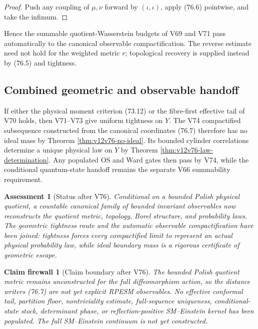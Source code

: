 \documentclass[11pt]{article}
\newtheorem{firewall}[theorem]{Claim firewall}
\newtheorem{assessment}[theorem]{Assessment}
\theoremstyle{remark}
\begin{document}
\begin{proof}
Push any coupling of \(\mu,\nu\) forward by
\((\iota,\iota)\), apply (76.6) pointwise, and take the infimum.
\end{proof}

Hence the summable quotient-Wasserstein budgets of V69 and V71 pass
automatically to the canonical observable compactification.  The
reverse estimate need not hold for the weighted metric \(r\);
topological recovery is supplied instead by (76.5) and tightness.

\subsection{Combined geometric and observable handoff}

If either the physical moment criterion (73.12) or the fibre-first
effective tail of V70 holds, then V71--V73 give uniform tightness on
\(Y\).  The V74 compactified subsequence constructed from the
canonical coordinates (76.7) therefore has no ideal mass by Theorem
\ref{thm:v12v76-no-ideal}.  Its bounded cylinder correlations
determine a unique physical law on \(Y\) by Theorem
\ref{thm:v12v76-law-determination}.  Any populated OS and Ward gates
then pass by V74, while the conditional quantum-state handoff remains
the separate V66 summability requirement.

\begin{assessment}[Status after V76]
\label{ass:v12v76-status}
Conditional on a bounded Polish physical quotient, a countable
canonical family of bounded invariant observables now reconstructs
the quotient metric, topology, Borel structure, and probability
laws.  The geometric tightness route and the automatic observable
compactification have been joined: tightness forces every
compactified limit to represent an actual physical probability law,
while ideal boundary mass is a rigorous certificate of geometric
escape.
\end{assessment}

\begin{firewall}[Claim boundary after V76]
\label{fire:v12v76-claim}
The bounded Polish quotient metric remains unconstructed for the
full diffeomorphism action, so the distance writers (76.7) are not
yet explicit RPESM observables.  No effective conformal tail,
partition floor, nontriviality estimate, full-sequence uniqueness,
conditional-state stock, determinant phase, or reflection-positive
SM--Einstein kernel has been populated.  The full SM--Einstein
continuum is not yet constructed.
\end{firewall}
\end{document}
